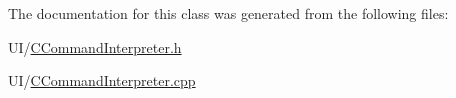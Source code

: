 The documentation for this class was generated from the following files\+:\begin{DoxyCompactItemize}
\item 
U\+I/\mbox{\hyperlink{_c_command_interpreter_8h}{C\+Command\+Interpreter.\+h}}\item 
U\+I/\mbox{\hyperlink{_c_command_interpreter_8cpp}{C\+Command\+Interpreter.\+cpp}}\end{DoxyCompactItemize}
